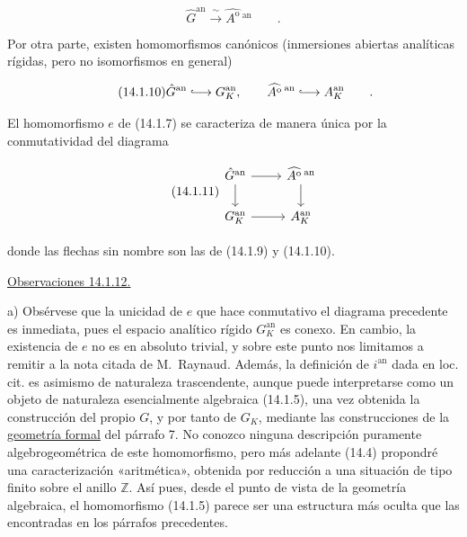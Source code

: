 \begin{equation}\tag{14.1.9}
 \hat G^{\mathrm{an}}\xrightarrow{\ \sim\ }
 \widehat{A^{\mathrm o}}\,{}^{\mathrm{an}}
 \qquad .
\end{equation}

\noindent
Por otra parte, existen homomorfismos canónicos (inmersiones abiertas
analíticas rígidas, pero no isomorfismos en general)

\begin{equation}\tag{14.1.10}
 \hat G^{\mathrm{an}}\lhook\joinrel\longrightarrow G_K^{\mathrm{an}},
 \qquad
 \widehat{A^{\mathrm o}}\,{}^{\mathrm{an}}
 \lhook\joinrel\longrightarrow A_K^{\mathrm{an}}
 \qquad .
\end{equation}

\noindent
El homomorfismo $e$ de (14.1.7) se caracteriza de manera única por la
conmutatividad del diagrama

\begin{equation}\tag{14.1.11}
\begin{tikzcd}
 \hat G^{\mathrm{an}} \arrow[r] \arrow[d]
   & \widehat{A^{\mathrm o}}\,{}^{\mathrm{an}} \arrow[d] \\
 G_K^{\mathrm{an}} \arrow[r] & A_K^{\mathrm{an}}
\end{tikzcd}
\end{equation}

\noindent
donde las flechas sin nombre son las de (14.1.9) y (14.1.10).

\medskip
\noindent
\underline{Observaciones 14.1.12.}

\smallskip
\noindent
a) Obsérvese que la unicidad de $e$ que hace conmutativo el diagrama
precedente es inmediata, pues el espacio analítico rígido
$G_K^{\mathrm{an}}$ es conexo. En cambio, la existencia de $e$ no es en
absoluto trivial, y sobre este punto nos limitamos a remitir a la nota
citada de M.~Raynaud. Además, la definición de $i^{\mathrm{an}}$ dada
en loc. cit. es asimismo de naturaleza trascendente, aunque puede
interpretarse como un objeto de naturaleza esencialmente algebraica
(14.1.5), una vez obtenida la construcción del propio $G$, y por tanto
de $G_K$, mediante las construcciones de la \underline{geometría formal}
del párrafo 7. No conozco ninguna descripción puramente
algebrogeométrica de este homomorfismo, pero más adelante (14.4)
propondré una caracterización «aritmética», obtenida por reducción a una
situación de tipo finito sobre el anillo $\mathbb Z$. Así pues, desde el
punto de vista de la geometría algebraica, el homomorfismo (14.1.5)
parece ser una estructura más oculta que las encontradas en los
párrafos precedentes.

